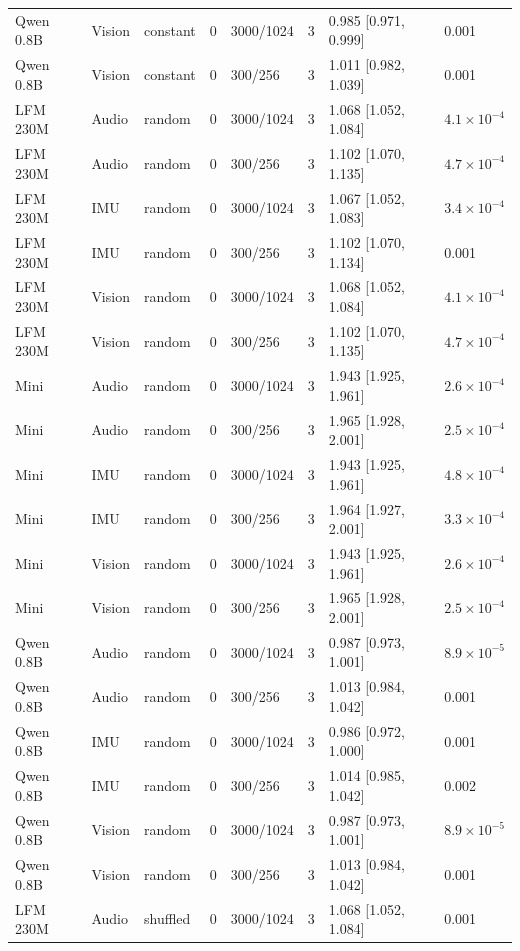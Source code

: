 {\begin{longtable}{@{}llllllll@{}}
Qwen 0.8B & Vision & constant & 0 & 3000/1024 & 3 & 0.985 [0.971, 0.999] & 0.001 \\
Qwen 0.8B & Vision & constant & 0 & 300/256 & 3 & 1.011 [0.982, 1.039] & 0.001 \\
LFM 230M & Audio & random & 0 & 3000/1024 & 3 & 1.068 [1.052, 1.084] & $4.1\times10^{-4}$ \\
LFM 230M & Audio & random & 0 & 300/256 & 3 & 1.102 [1.070, 1.135] & $4.7\times10^{-4}$ \\
LFM 230M & IMU & random & 0 & 3000/1024 & 3 & 1.067 [1.052, 1.083] & $3.4\times10^{-4}$ \\
LFM 230M & IMU & random & 0 & 300/256 & 3 & 1.102 [1.070, 1.134] & 0.001 \\
LFM 230M & Vision & random & 0 & 3000/1024 & 3 & 1.068 [1.052, 1.084] & $4.1\times10^{-4}$ \\
LFM 230M & Vision & random & 0 & 300/256 & 3 & 1.102 [1.070, 1.135] & $4.7\times10^{-4}$ \\
Mini & Audio & random & 0 & 3000/1024 & 3 & 1.943 [1.925, 1.961] & $2.6\times10^{-4}$ \\
Mini & Audio & random & 0 & 300/256 & 3 & 1.965 [1.928, 2.001] & $2.5\times10^{-4}$ \\
Mini & IMU & random & 0 & 3000/1024 & 3 & 1.943 [1.925, 1.961] & $4.8\times10^{-4}$ \\
Mini & IMU & random & 0 & 300/256 & 3 & 1.964 [1.927, 2.001] & $3.3\times10^{-4}$ \\
Mini & Vision & random & 0 & 3000/1024 & 3 & 1.943 [1.925, 1.961] & $2.6\times10^{-4}$ \\
Mini & Vision & random & 0 & 300/256 & 3 & 1.965 [1.928, 2.001] & $2.5\times10^{-4}$ \\
Qwen 0.8B & Audio & random & 0 & 3000/1024 & 3 & 0.987 [0.973, 1.001] & $8.9\times10^{-5}$ \\
Qwen 0.8B & Audio & random & 0 & 300/256 & 3 & 1.013 [0.984, 1.042] & 0.001 \\
Qwen 0.8B & IMU & random & 0 & 3000/1024 & 3 & 0.986 [0.972, 1.000] & 0.001 \\
Qwen 0.8B & IMU & random & 0 & 300/256 & 3 & 1.014 [0.985, 1.042] & 0.002 \\
Qwen 0.8B & Vision & random & 0 & 3000/1024 & 3 & 0.987 [0.973, 1.001] & $8.9\times10^{-5}$ \\
Qwen 0.8B & Vision & random & 0 & 300/256 & 3 & 1.013 [0.984, 1.042] & 0.001 \\
LFM 230M & Audio & shuffled & 0 & 3000/1024 & 3 & 1.068 [1.052, 1.084] & 0.001 \\

\end{longtable}}
